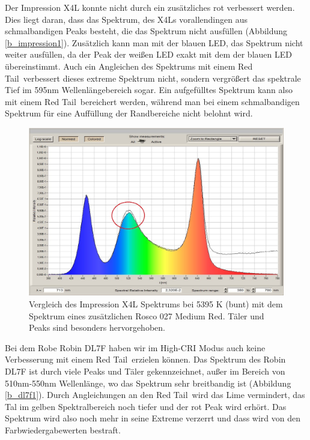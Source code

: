 Der Impression X4L konnte nicht durch ein zusätzliches rot verbessert werden. Dies liegt daran, dass das Spektrum, des X4Ls vorallendingen aus schmalbandigen Peaks besteht, die das Spektrum nicht ausfüllen (Abbildung \ref{b_impression1}). Zusätzlich kann man mit der blauen LED, das Spektrum nicht weiter ausfüllen, da der Peak der weißen LED exakt mit dem der blauen LED übereinstimmt. Auch ein Angleichen des Spektrums mit einem \glqq Red Tail\grqq\ verbessert dieses extreme Spektrum nicht, sondern vergrößert das spektrale Tief im 595nm Wellenlängebereich sogar. Ein aufgefülltes Spektrum kann also mit einem \glqq Red Tail\grqq\ bereichert werden, während man bei einem schmalbandigen Spektrum für eine Auffüllung der Randbereiche nicht belohnt wird.\\

\begin{figure}[H]     %
\centering
\includegraphics[width=1.0\textwidth]{bilder/glp1} 
\caption {Vergleich des Impression X4L Spektrums bei 5395 K (bunt) mit dem Spektrum eines zusätzlichen Rosco 027 \glqq Medium Red\grqq . Täler und Peaks sind besonders hervorgehoben.}\label{b_glp1}
\end{figure}

Bei dem Robe Robin DL7F haben wir im High-CRI Modus auch keine Verbesserung mit einem \glqq Red Tail\grqq\ erzielen können. Das Spektrum des Robin DL7F ist durch viele Peaks und Täler gekennzeichnet, außer im Bereich von 510nm-550nm Wellenlänge, wo das Spektrum sehr breitbandig ist (Abbildung \ref{b_dl7f1}). Durch Angleichungen an den \glqq Red Tail\grqq\ wird das Lime vermindert, das Tal im gelben Spektralbereich noch tiefer und der rot Peak wird erhört. Das Spektrum wird also noch mehr in seine Extreme verzerrt und dass wird von den Farbwiedergabewerten bestraft.

